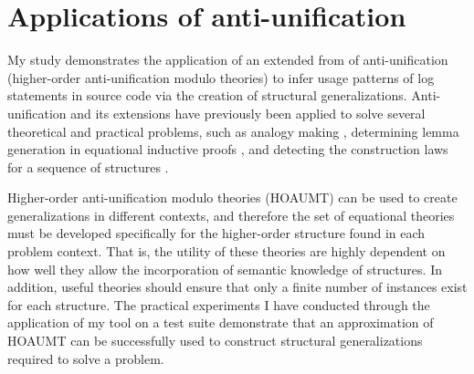 \section{Applications of anti-unification}  \label{auTheory}
My study demonstrates the application of an extended from of anti-unification (higher-order anti-unification modulo theories) to infer usage patterns of log statements in source code via the creation of structural generalizations. Anti-unification and its extensions have previously been applied to solve several theoretical and practical problems, such as analogy making \cite{guhe2010mathematical}, determining lemma generation in equational inductive proofs \cite{2005:aij:burghardt}, and detecting the construction laws for a sequence of structures \cite{2005:aij:burghardt}.


Higher-order anti-unification modulo theories (HOAUMT) can be used to create generalizations in different contexts, and therefore the set of equational theories must be developed specifically for the higher-order structure found in each problem context. That is, the utility of these theories are highly dependent on how well they allow the incorporation of semantic knowledge of structures. In addition, useful theories should ensure that only a finite number of instances exist for each structure. The practical experiments I have conducted through the application of my tool on a test suite demonstrate that an approximation of HOAUMT can be successfully used to construct structural generalizations required to solve a problem.



